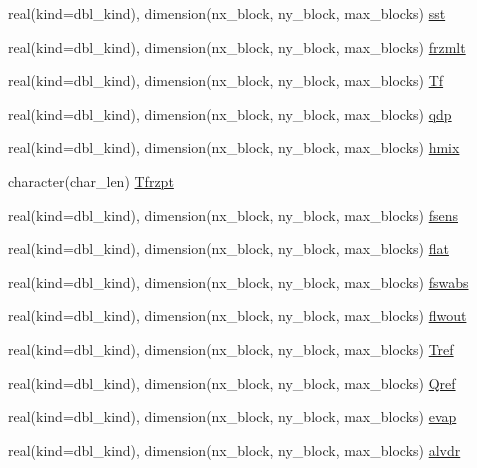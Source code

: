 \begin{DoxyCompactItemize}
real(kind=dbl\_\-kind), dimension(nx\_\-block, ny\_\-block, max\_\-blocks) \hyperlink{namespaceice__flux_a760acd33d8c9c15ba312e94fc8b6cdec}{sst}
\item 
real(kind=dbl\_\-kind), dimension(nx\_\-block, ny\_\-block, max\_\-blocks) \hyperlink{namespaceice__flux_af09eb2a499606f27cd8ba847a999df71}{frzmlt}
\item 
real(kind=dbl\_\-kind), dimension(nx\_\-block, ny\_\-block, max\_\-blocks) \hyperlink{namespaceice__flux_a3facf6772fad8bd7af98c69cd56db10c}{Tf}
\item 
real(kind=dbl\_\-kind), dimension(nx\_\-block, ny\_\-block, max\_\-blocks) \hyperlink{namespaceice__flux_a178c03fc7b766259d4b973b4d055aa1d}{qdp}
\item 
real(kind=dbl\_\-kind), dimension(nx\_\-block, ny\_\-block, max\_\-blocks) \hyperlink{namespaceice__flux_ab583d7ec90095ce5df9f425a98b70dbd}{hmix}
\item 
character(char\_\-len) \hyperlink{namespaceice__flux_a230173f0ff542e8f4cdc68f1c6a469f9}{Tfrzpt}
\item 
real(kind=dbl\_\-kind), dimension(nx\_\-block, ny\_\-block, max\_\-blocks) \hyperlink{namespaceice__flux_ad76df6df986573fcb622fb418d960f37}{fsens}
\item 
real(kind=dbl\_\-kind), dimension(nx\_\-block, ny\_\-block, max\_\-blocks) \hyperlink{namespaceice__flux_ab2d967d4946f473fc077416bdd6cd13f}{flat}
\item 
real(kind=dbl\_\-kind), dimension(nx\_\-block, ny\_\-block, max\_\-blocks) \hyperlink{namespaceice__flux_af3384816a4840e4df4c79f158e6e9762}{fswabs}
\item 
real(kind=dbl\_\-kind), dimension(nx\_\-block, ny\_\-block, max\_\-blocks) \hyperlink{namespaceice__flux_a1ec39d9db775aa2496c0c0ad3ab9c8e4}{flwout}
\item 
real(kind=dbl\_\-kind), dimension(nx\_\-block, ny\_\-block, max\_\-blocks) \hyperlink{namespaceice__flux_a6a0b5fa95bab43f29f8cbd6cbd8f047f}{Tref}
\item 
real(kind=dbl\_\-kind), dimension(nx\_\-block, ny\_\-block, max\_\-blocks) \hyperlink{namespaceice__flux_ac332e72481b7da42322f9e2581f09434}{Qref}
\item 
real(kind=dbl\_\-kind), dimension(nx\_\-block, ny\_\-block, max\_\-blocks) \hyperlink{namespaceice__flux_abfe856f2125b879db70ba8a8a43aaefd}{evap}
\item 
real(kind=dbl\_\-kind), dimension(nx\_\-block, ny\_\-block, max\_\-blocks) \hyperlink{namespaceice__flux_a87ebd7f059dc2e9052efba54a0d361ec}{alvdr}

\end{DoxyCompactItemize}
